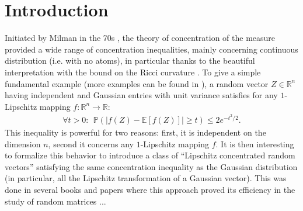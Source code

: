 \documentclass{ws-rmta}
\begin{document}
\section*{Introduction}
Initiated by Milman in the 70s \cite{MIL71}, the theory of concentration of the measure provided a wide range of concentration inequalities, mainly concerning continuous distribution (i.e. with no atoms), in particular thanks to the beautiful interpretation with the bound on the Ricci curvature \cite{GRO79}. To give a simple fundamental example (more examples can be found in \cite{LED05}), a random vector $Z \in \mathbb R^n$ having independent and Gaussian entries with unit variance satisfies for any $1$-Lipschitz mapping $f: \mathbb R^n \to \mathbb R$:
\begin{align}\label{eq:concentration_lipschitz}
  \forall t >0: \ \ \mathbb P \left( \left\vert f(Z) - \mathbb E[f(Z)] \right\vert \geq t \right) \leq 2 e^{-t^2/2}.
\end{align}
This inequality is powerful for two reasons: first, it is independent on the dimension $n$, second it concerns any $1$-Lipschitz mapping $f$. It is then interesting to formalize this behavior to introduce a class of ``Lipschitz concentrated random vectors'' satisfying the same concentration inequality as the Gaussian distribution (in particular, all the Lipschitz transformation of a Gaussian vector). This was done in several books and papers where this approach proved its efficiency in the study of random matrices \cite{TAO12,ELK09,LOU21RHL}...
\end{document}
